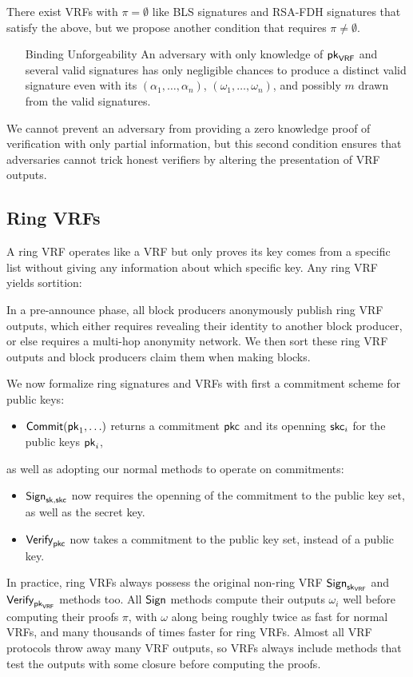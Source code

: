 There exist VRFs with $\pi = \emptyset$ like BLS signatures and RSA-FDH signatures that satisfy the above, but we propose another condition that requires $\pi \ne \emptyset$.
\begin{enumerate}
\item[Binding Unforgeability] An adversary with only knowledge of $\mathsf{pk}_{\mathsf{VRF}}$ and several valid signatures has only negligible chances to produce a distinct valid signature even with its $(\alpha_1,\ldots,\alpha_n)$, $(\omega_1,\ldots,\omega_n)$, and possibly $m$ drawn from the valid signatures.
\end{enumerate}
We cannot prevent an adversary from providing a zero knowledge proof of verification with only partial information, but this second condition ensures that adversaries cannot trick honest verifiers by altering the presentation of VRF outputs.  

\subsection{Ring VRFs}

A ring VRF operates like a VRF but only proves its key comes from a specific list without giving any information about which specific key.  Any ring VRF yields sortition:

In a pre-announce phase, all block producers anonymously publish ring VRF outputs, which either requires revealing their identity to another block producer, or else requires a multi-hop anonymity network.  We then sort these ring VRF outputs and block producers claim them when making blocks.

We now formalize ring signatures and VRFs with first a commitment scheme for public keys:
\begin{itemize}
\item $\mathsf{Commit}(\mathsf{pk}_1,\ldots)$ returns a commitment $\mathsf{pkc}$ and its openning $\mathsf{skc}_i$ for the public keys $\mathsf{pk}_i$,
\end{itemize}
as well as adopting our normal methods to operate on commitments:
\begin{itemize}
\item $\mathsf{Sign}_{\mathsf{sk},\mathsf{skc}}$ now requires the openning of the commitment to the public key set, as well as the secret key.
\item $\mathsf{Verify}_{\mathsf{pkc}}$ now takes a commitment to the public key set, instead of a public key.
\end{itemize}
In practice, ring VRFs always possess the original non-ring VRF $\mathsf{Sign}_{\mathsf{sk}_{\mathsf{VRF}}}$ and $\mathsf{Verify}_{\mathsf{pk}_{\mathsf{VRF}}}$ methods too.  All $\mathsf{Sign}$ methods compute their outputs $\omega_i$ well before computing their proofs $\pi$, with $\omega$ along being roughly twice as fast for normal VRFs, and many thousands of times faster for ring VRFs.  Almost all VRF protocols throw away many VRF outputs, so VRFs always include methods that test the outputs with some closure before computing the proofs.

